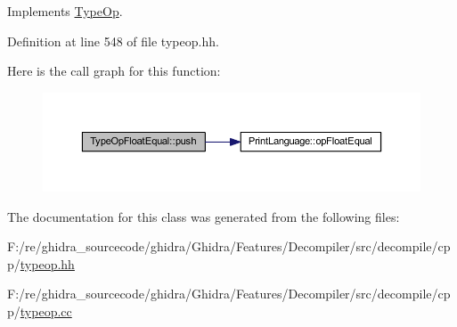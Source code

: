Implements \mbox{\hyperlink{class_type_op_ac9c9544203ed74dabe6ac662b653b2af}{Type\+Op}}.



Definition at line 548 of file typeop.\+hh.

Here is the call graph for this function\+:
\nopagebreak
\begin{figure}[H]
\begin{center}
\leavevmode
\includegraphics[width=350pt]{class_type_op_float_equal_a4252abd880968a0e035d0520cb1ae172_cgraph}
\end{center}
\end{figure}


The documentation for this class was generated from the following files\+:\begin{DoxyCompactItemize}
\item 
F\+:/re/ghidra\+\_\+sourcecode/ghidra/\+Ghidra/\+Features/\+Decompiler/src/decompile/cpp/\mbox{\hyperlink{typeop_8hh}{typeop.\+hh}}\item 
F\+:/re/ghidra\+\_\+sourcecode/ghidra/\+Ghidra/\+Features/\+Decompiler/src/decompile/cpp/\mbox{\hyperlink{typeop_8cc}{typeop.\+cc}}\end{DoxyCompactItemize}
